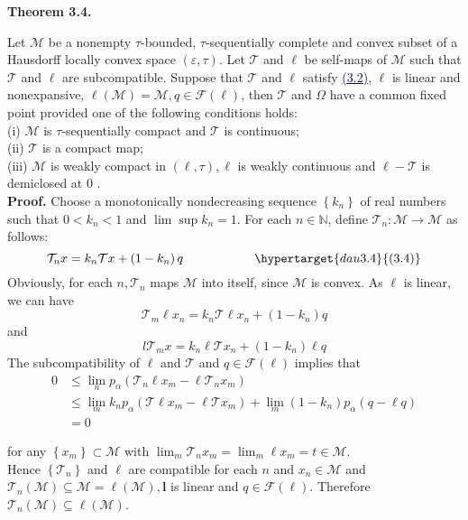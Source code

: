 \documentclass[12pt,a4paper,two side]{article}
\begin{document}
\hypertarget{muc3.4}{\textbf{Theorem 3.4.}} Let $\mathcal{M}$ be a nonempty $\tau$-bounded, $\tau$-sequentially complete and convex subset of a Hausdorff locally convex space $(\varepsilon, \tau)$. Let $\mathcal{T}$ and $\ell$ be self-maps of $\mathcal{M}$ such that $\mathcal{T}$ and $\ell$ are subcompatible. Suppose that $\mathcal{T}$ and $\ell$ satisfy \hyperlink{dau3.2}{\textcolor{Darkblue}{(3.2)}}, $\ell$ is linear and nonexpansive, $\ell(\mathcal{M})=\mathcal{M}, q \in \mathcal{F}(\ell)$, then $\mathcal{T}$ and $\Omega$ have a common fixed point provided one of the following conditions holds:\\
(i) $\mathcal{M}$ is $\tau$-sequentially compact and $\mathcal{T}$ is continuous;\\
(ii) $\mathcal{T}$ is a compact map;\\
(iii) $\mathcal{M}$ is weakly compact in $(\mathcal{\ell}, \tau), \ell$ is weakly continuous and $\ell-\mathcal{T}$ is demiclosed at 0 .\\

\textbf{Proof.} Choose a monotonically nondecreasing sequence $\left\{k_n\right\}$ of real numbers such that $0<k_n<1$ and $\lim \sup k_n=1$. For each $n \in \mathbb{N}$, define $\mathcal{T}_n: \mathcal{M} \rightarrow \mathcal{M}$ as follows:
$$
\mathcal{T}_n x=k_n \mathcal{T} x+\left(1-k_n\right) q \ \ \ \ \ \ \ \ \ \ \ \ \ \ \ \ \ \hypertarget{dau3.4}{(3.4)} 
$$
Obviously, for each $n, \mathcal{T}_n$ maps $\mathcal{M}$ into itself, since $\mathcal{M}$ is convex.
As $\ell$ is linear, we can have\\
$$
\mathcal{T}_m \ell x_n=k_n \mathcal{T} \ell x_n+\left(1-k_n\right) q
$$
and
$$
l \mathcal{T}_m x=k_n \ell \mathcal{T} x_n+\left(1-k_n\right) \ell q
$$
The subcompatibility of $\ell$ and $\mathcal{T}$ and $q \in \mathcal{F}(\ell)$ implies that
$$
\begin{aligned}
0 & \leq \lim _n p_\alpha\left(\mathcal{T}_n \ell x_m-\ell \mathcal{T}_n x_m\right) \\
& \leq \lim _m k_n p_\alpha\left(\mathcal{T} \ell x_m-\ell \mathcal{T} x_m\right)+\lim _m\left(1-k_n\right) p_\alpha(q-\ell q) \\
& =0
\end{aligned}
$$

for any $\left\{x_m\right\} \subset \mathcal{M}$ with $\lim _m \mathcal{T}_n x_m=\lim _m \ell x_m=t \in \mathcal{M}$.\\
Hence $\left\{\mathcal{T}_n\right\}$ and $\ell$ are compatible for each $n$ and $x_n \in \mathcal{M}$ and $\mathcal{T}_n(\mathcal{M}) \subseteq \mathcal{M}=\ell(\mathcal{M}), \boldsymbol{l}$ is linear and $q \in \mathcal{F}(\ell)$. Therefore $\mathcal{T}_n(\mathcal{M}) \subseteq \ell(\mathcal{M})$.\\
\end{document}
